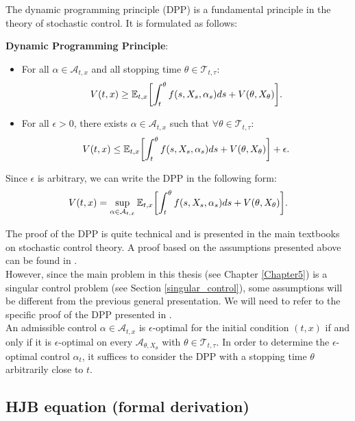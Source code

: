 \noindent
The dynamic programming principle (DPP) is a fundamental principle in the theory of stochastic control. It is formulated as follows:
\begin{Theorem} \textbf{Dynamic Programming Principle}:
 \begin{itemize}
  \item For all $\alpha \in \mathcal{A}_{t,x}$ and all stopping time $\theta \in \mathcal{T}_{t,\tau}$:
  \begin{equation}\label{DPP1}
   V(t,x) \geq \mathbb{E}_{t,x} \biggl[ \int_t^{\theta} f(s,X_s,\alpha_s) ds + V(\theta, X_{\theta}) \biggr]. 
  \end{equation}
  \item For all $\epsilon > 0$, there exists $\alpha \in \mathcal{A}_{t,x}$ such that $\forall \theta \in \mathcal{T}_{t,\tau}$: 
  \begin{equation}\label{DPP2}
      V(t,x) \leq \mathbb{E}_{t,x} \biggl[ \int_t^{\theta} f(s,X_s,\alpha_s) ds + V(\theta, X_{\theta}) \biggr] + \epsilon. 
  \end{equation}
 \end{itemize}
 Since $\epsilon$ is arbitrary, we can write the DPP in the following form:
  \begin{equation}\label{DPP3}
   V(t,x) = \sup_{\alpha \in \mathcal{A}_{t,x}} \mathbb{E}_{t,x} \biggl[ \int_t^{\theta} f(s,X_s,\alpha_s) ds + V(\theta, X_{\theta}) \biggr]. 
  \end{equation}
\end{Theorem}
The proof of the DPP is quite technical and is presented in the main textbooks on stochastic control theory.   
A proof based on the assumptions presented above can be found in \cite{Gol16}.\\
However, since the main problem in this thesis (see Chapter \ref{Chapter5}) is a singular control problem (see Section \ref{singular_control}), 
some assumptions will be different from the previous general presentation.
We will need to refer to the specific proof of the DPP presented in \cite{Kab16}.    \\


\noindent
An admissible control $\alpha \in \mathcal{A}_{t,x}$ is $\epsilon$-optimal for the initial condition $(t,x)$ if and only if it is $\epsilon$-optimal 
on every $\mathcal{A}_{\theta, X_{\theta}}$ with 
$\theta \in \mathcal{T}_{t,\tau}$. In order to determine the $\epsilon$-optimal control $\alpha_t$, it suffices to consider the DPP with a stopping time $\theta$
arbitrarily close to $t$.

\subsection{HJB equation (formal derivation)}

